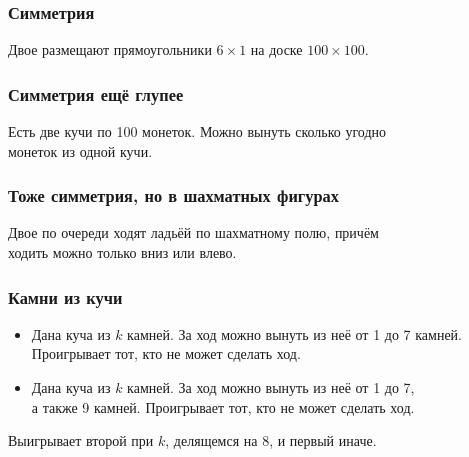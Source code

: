 \begin{frame} \frametitle{Симметрия}
	Двое размещают прямоугольники $6 \times 1$ на доске $100 \times 100$. \medskip \pause

\begin{center}  \end{center}
\end{frame}

\begin{frame} \frametitle{Симметрия ещё глупее}
	Есть две кучи по 100 монеток. Можно вынуть сколько угодно \\
	монеток из одной кучи.
	\medskip \pause

\begin{center}  \end{center}
\end{frame}

\begin{frame} \frametitle{Тоже симметрия, но в шахматных фигурах}
	Двое по очереди ходят ладьёй по шахматному полю, причём \\
	ходить можно только вниз или влево. \medskip \pause

\begin{center}  \end{center}
\end{frame}

\begin{frame} \frametitle{Камни из кучи}
\begin{itemize} \itemsep=2.25mm
	\item Дана куча из $k$ камней. За ход можно вынуть из неё от 1 до 7 камней. Проигрывает тот, кто не может сделать ход.
	\item Дана куча из $k$ камней. За ход можно вынуть из неё от 1 до 7, \\ а также 9 камней. Проигрывает тот, кто не может сделать ход.
\end{itemize} \bigskip \pause

Выигрывает второй при $k$, делящемся на 8, и первый иначе.
\end{frame}